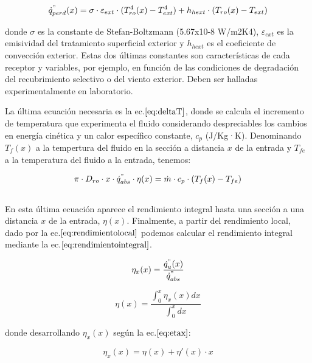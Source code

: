 \documentclass[11pt]{article}
\begin{document}
\begin{equation}
    \dot{q}^{"}_{perd}(x)= \sigma \cdot \varepsilon_{ext} \cdot (T_{ro}^{4}(x)-T_{ext}^{4}) + h_{hext} \cdot (T_{ro}(x)-T_{ext}) \label{eq:qperd}
\end{equation}

donde \(\sigma\) es la constante de Stefan-Boltzmann (5.67x10-8 W/m2K4),
\(\varepsilon_{ext}\) es la emisividad del tratamiento superficial
exterior y \(h_{hext}\) es el coeficiente de convección exterior. Estas
dos últimas constantes son características de cada receptor y variables,
por ejemplo, en función de las condiciones de degradación del
recubrimiento selectivo o del viento exterior. Deben ser halladas
experimentalmente en laboratorio.

La última ecuación necesaria es la ec.\(\eqref{eq:deltaT}\), donde se
calcula el incremento de temperatura que experimenta el fluido
considerando despreciables los cambios en energía cinética y un calor
específico constante, \(c_{p}\) (J/Kg·K). Denominando \(T_{f}(x)\) a la
tempertura del fluido en la sección a distancia \(x\) de la entrada y
\(T_{fe}\) a la temperatura del fluido a la entrada, tenemos:

\begin{equation}
    \pi \cdot D_{ro} \cdot x \cdot \dot{q}^{"}_{abs} \cdot \eta(x)= \dot{m} \cdot c_{p} \cdot (T_{f}(x)-T_{fe}) \label{eq:deltaT}
\end{equation}\\

En esta última ecuación aparece el rendimiento integral hasta una
sección a una distancia \(x\) de la entrada, \(\eta(x)\). Finalmente, a
partir del rendimiento local, dado por la
ec.\(\eqref{eq:rendimientolocal}\) podemos calcular el rendimiento
integral mediante la ec.\(\eqref{eq:rendimientointegral}\).

\begin{equation}
    \eta_{x}(x) = \frac{\dot{q}^{"}_{u}(x)}{\dot{q}^{"}_{abs}} \label{eq:rendimientolocal}
\end{equation}

\begin{equation}
    \eta(x) = \frac{\int_{0}^{x}\eta_{x}(x)dx}{\int_{0}^{x}dx} \label{eq:rendimientointegral}
\end{equation}

donde desarrollando \(\eta_{x}(x)\) según la ec.\(\eqref{eq:etax}\):

\begin{equation}
    \eta_{x}(x) = \eta(x) + \eta'(x)\cdot x  \label{eq:etax}
\end{equation}
\end{document}
